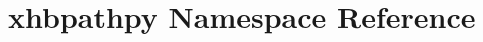 \hypertarget{namespacexhbpathpy}{\section{xhbpathpy Namespace Reference}
\label{namespacexhbpathpy}
}
